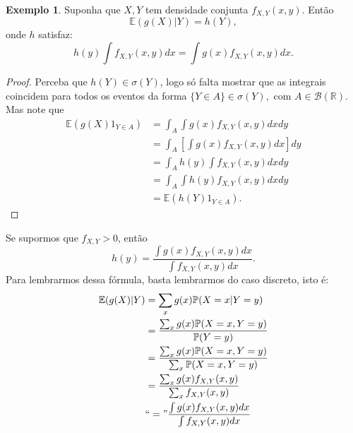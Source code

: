\documentclass[12pt,a4paper,oneside]{book}
\theoremstyle{definition}
\newtheorem{example}[theorem]{Exemplo}
\theoremstyle{remark}
\numberwithin{equation}{section}
\newcommand{\R}{\mathbb{R}}
\newcommand{\E}{\mathbb{E}}
\newcommand{\pr}{\mathbb{P}}
\begin{document}
\begin{example} Suponha que $X,Y$ tem densidade conjunta $f_{X,Y}(x,y)$. 
Então
$$\E(g(X)|Y) = h(Y), $$
onde  $h$ satisfaz:
$$h(y)\int f_{X,Y}(x,y)dx = \int g(x)f_{X,Y}(x,y)dx .$$
\begin{proof}
Perceba que $h(Y)\in \sigma(Y)$, logo só falta mostrar que as integrais  coincidem para todos os eventos da forma $\{Y\in A\}\in \sigma(Y),$ com $A\in \mathcal{B}(\R).$ Mas note que 
\begin{align*}
\E(g(X)1_{Y\in A}) &= \int_A\int g(x)f_{X,Y}(x,y)dxdy\\
         &=\int_A\left[\int g(x)f_{X,Y}(x,y)dx\right]dy\\
         &=\int_Ah(y)\int f_{X,Y}(x,y)dxdy \\
         &= \int_A\int h(y)f_{X,Y}(x,y)dxdy\\
         &= \E(h(Y)1_{Y\in A}).
\end{align*}

\end{proof}

  
\begin{tcolorbox}[colback = yellow!60]
Se supormos que $f_{X,Y}>0$, então
$$h(y)      = \dfrac{\int g(x)f_{X,Y}(x,y)dx}{\int f_{X,Y}(x,y)dx} .$$
Para lembrarmos dessa fórmula, basta lembrarmos do caso discreto, isto é:
\begin{align*}
\E(g(X)|Y)  &= \sum_{x}g(x)\pr(X=x|Y=y)\\
			&= \dfrac{\sum_x g(x)\pr(X=x,Y=y)}{\pr(Y=y)}\\
			&=  \dfrac{\sum_x g(x)\pr(X=x,Y=y)}{\sum_x\pr(X=x,Y=y)}\\
			&=  \dfrac{\sum_x g(x)f_{X,Y}(x,y)}{\sum_xf_{X,Y}(x,y)}	\\
			&``="  \dfrac{\int g(x)f_{X,Y}(x,y)dx}{\int f_{X,Y}(x,y)dx}	\\
\end{align*}
\end{tcolorbox}

\end{example}
\end{document}
